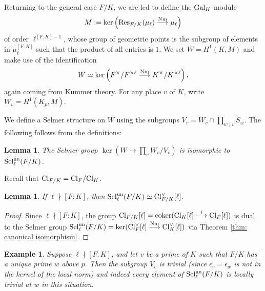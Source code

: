 \documentclass[11pt,a4paper]{amsart}
\def\Nm{{\rm Nm}}
\def\un{{\rm un}}
\def\Cl{{\rm Cl}}
\def\Res{{\rm Res}}
\def\Gal{{\rm Gal}}
\def\Sel{{\rm Sel}}
\numberwithin{equation}{section}
\newtheorem{lemma}[theorem]{Lemma}
\newtheorem{example}[theorem]{Example}
\begin{document}
Returning to the general case $F/K$, we are led to define the $\Gal_K$-module 
\[M := \ker\left(\Res_{F/K}(\mu_\ell) \stackrel{\Nm}{\longrightarrow} \mu_\ell\right)\]
of order $\ell^{[F \colon K] - 1}$, whose group of geometric points is the subgroup of elements in $\mu_\ell^{[F \colon K]}$ such that the product of all entries is $1$.  We set $W = H^1(K, M)$ and make use of the identification  
\[W \simeq \ker\left(F^\times/F^{\times\ell} \stackrel{\Nm}{\longrightarrow}K^\times/K^{\times \ell}\right),\]
again coming from Kummer theory.
For any place $v$ of $K$, write $W_v = H^1(K_p, M)$. 

We define a Selmer structure on $W$ using the subgroups $V_v =W_v \cap \prod_{w \mid v} S_w$. The following follows from the definitions:

\begin{lemma}
    The Selmer group $\ker(W \to \prod_v W_v/V_v)$ is isomorphic to $\Sel_\ell^\un(F/K)$.
\end{lemma}


Recall that $\Cl_{F/K} = \Cl_F/\Cl_K$. 
\begin{lemma}
    If $\ell \nmid [F \colon K]$, then $\Sel_\ell^\un(F/K) \simeq \Cl_{F/K}^\vee[\ell]$.
\end{lemma}
\begin{proof}
    Since $\ell \nmid [F \colon K]$, the group $\Cl_{F/K}[\ell] = \mathrm{coker}(\Cl_K[\ell] \stackrel{i}{\longrightarrow} \Cl_F[\ell])$ is dual to the Selmer group $\Sel_\ell^\un(F/K) = \ker(\Cl_F^\vee[\ell] \stackrel{\Nm}{\longrightarrow}\Cl_K^\vee[\ell])$ via Theorem \ref{thm: canonical isomorphism}. 
\end{proof}

\begin{example}\label{ex: local triviality}
{\em 
    Suppose $\ell \nmid [F \colon K]$, and let $v$ be a prime of $K$ such that $F/K$ has a unique prime $w$ above $p$. Then the subgroup $V_v$ is trivial (since $\epsilon_v = \epsilon_w$ is not in the kernel of the local norm) and indeed every element of $\Sel_\ell^\un(F/K)$ is locally trivial at $w$ in this situation.  
    }
\end{example}
\end{document}
